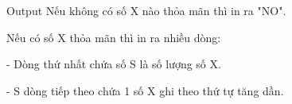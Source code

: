 Output
Nếu không có số X nào thỏa mãn thì in ra "NO".

Nếu có số X thỏa mãn thì in ra nhiều dòng:


- Dòng thứ nhất chứa số S là số lượng số X.


- S dòng tiếp theo chứa 1 số X ghi theo thứ tự tăng dần.